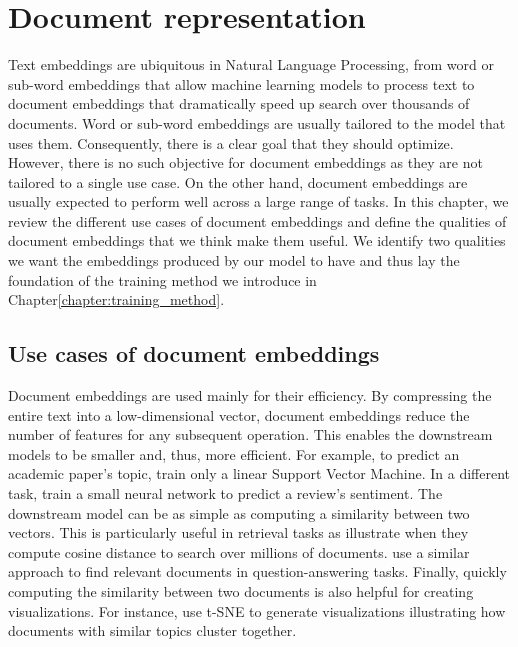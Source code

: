 \chapter{Document representation}\label{chapter:document_representation}

Text embeddings are ubiquitous in Natural Language Processing, from word or sub-word embeddings that allow machine learning models to process text to document embeddings that dramatically speed up search over thousands of documents. Word or sub-word embeddings are usually tailored to the model that uses them. Consequently, there is a clear goal that they should optimize. However, there is no such objective for document embeddings as they are not tailored to a single use case. On the other hand, document embeddings are usually expected to perform well across a large range of tasks. In this chapter, we review the different use cases of document embeddings and define the qualities of document embeddings that we think make them useful. We identify two qualities we want the embeddings produced by our model to have and thus lay the foundation of the training method we introduce in Chapter\ref{chapter:training_method}.

\section{Use cases of document embeddings}

Document embeddings are used mainly for their efficiency. By compressing the entire text into a low-dimensional vector, document embeddings reduce the number of features for any subsequent operation. This enables the downstream models to be smaller and, thus, more efficient. For example, to predict an academic paper's topic,  \cite{cohan2020specter} train only a linear Support Vector Machine. In a different task, \cite{le2014distributed} train a small neural network to predict a review's sentiment. The downstream model can be as simple as computing a similarity between two vectors. This is particularly useful in retrieval tasks as \cite{neelakantan2022text,izacard2021unsupervised} illustrate when they compute cosine distance to search over millions of documents. \cite{neelakantan2022text} use a similar approach to find relevant documents in question-answering tasks. Finally, quickly computing the similarity between two documents is also helpful for creating visualizations. For instance, \cite{cohan2020specter,dai2015document} use t-SNE \citep{van2014accelerating} to generate visualizations illustrating how documents with similar topics cluster together.


